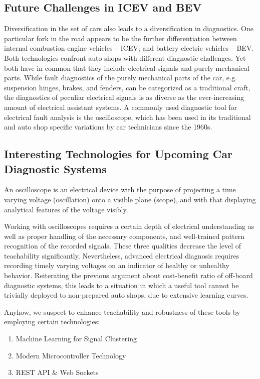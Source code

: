 \subsection{Future Challenges in ICEV and BEV}
Diversification in the set of cars also leads to a diversification in diagnostics. 
One particular fork in the road appears to be the further differentiation between internal combustion engine vehicles – ICEV; and battery electric vehicles – BEV. 
Both technologies confront auto shops with different diagnostic challenges. 
Yet both have in common that they include electrical signals and purely mechanical parts. 
While fault diagnostics of the purely mechanical parts of the car, e.g. suspension hinges, brakes, and fenders, can be categorized as a traditional craft, the diagnostics of peculiar electrical signals is as diverse as the ever-increasing amount of electrical assistant systems. 
A commonly used diagnostic tool for electrical fault analysis is the oscilloscope, which has been used in its traditional and auto shop specific variations by car technicians since the 1960s.

\subsection{Interesting Technologies for Upcoming Car Diagnostic Systems}
An oscilloscope is an electrical device with the purpose of projecting a time varying voltage (oscillation) onto a visible plane (scope), and with that displaying analytical features of the voltage visibly.

Working with oscilloscopes requires a certain depth of electrical understanding as well as proper handling of the necessary components, and well-trained pattern recognition of the recorded signals. 
These three qualities decrease the level of teachability significantly. 
Nevertheless, advanced electrical diagnosis requires recording timely varying voltages on an indicator of healthy or unhealthy behavior. 
Reiterating the previous argument about cost-benefit ratio of off-board diagnostic systems, this leads to a situation in which a useful tool cannot be trivially deployed to non-prepared auto shops, due to extensive learning curves.

Anyhow, we suspect to enhance teachability and robustness of these tools by employing certain technologies:
\begin{enumerate}
  \item Machine Learning for Signal Clustering
  \item Modern Microcontroller Technology
  \item REST API \& Web Sockets
\end{enumerate}

